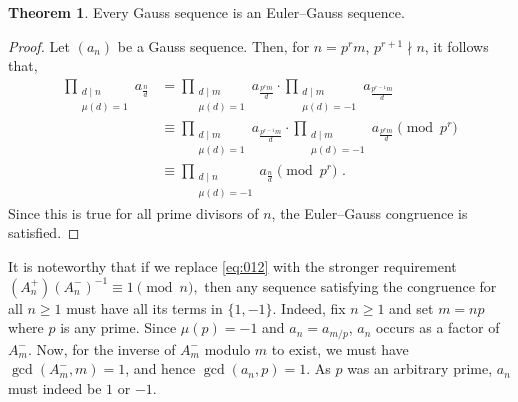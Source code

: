 \documentclass{article}
\numberwithin{equation}{section}
\theoremstyle{definition}
\newtheorem{theorem}[definition]{\bf {Theorem}}
\begin{document}
\begin{theorem}\label{thm:4}
    Every Gauss sequence is an Euler--Gauss sequence.
\end{theorem}
\begin{proof}
    Let $(a_n)$ be a Gauss sequence. Then, for $n=p^rm$, $p^{r+1}\nmid n$, it follows that, 
    \begin{align*}
        \prod_{\substack{d\mid n\\\mu(d)=1}}a_\frac{n}{d}
        &=\prod_{\substack{d\mid m\\\mu(d)=1}}a_\frac{p^rm}{d}\cdot\prod_{\substack{d\mid m\\\mu(d)=-1}}a_\frac{p^{r-1}m}{d}\\
        &\equiv \prod_{\substack{d\mid m\\\mu(d)=1}}a_\frac{p^{r-1}m}{d}\cdot\prod_{\substack{d\mid m\\\mu(d)=-1}}a_\frac{p^{r}m}{d} \pmod{p^r}\\
        &\equiv \prod_{\substack{d\mid n\\\mu(d)=-1}}a_\frac{n}{d} \pmod{p^r} \text{ .}
    \end{align*}
Since this is true for all prime divisors of $n$, the Euler--Gauss congruence is satisfied.
\end{proof}



It is noteworthy that if we replace \eqref{eq:012} with the stronger requirement $(A_n^+)(A_n^-)^{-1}\equiv1\pmod{n},$
then any sequence satisfying the congruence for all $n\geq1$ must have all its terms in $\{1,-1\}$. Indeed, fix $n\geq1$ and set $m=np$ where $p$ is any prime. Since $\mu(p)=-1$ and $a_n=a_{m/p}$, $a_n$ occurs as a factor of $A_m^-$. Now, for the inverse of $A_m^-$ modulo $m$ to exist, we must have $\gcd(A_m^-,m)=1$, and hence $\gcd(a_n,p)=1$. As $p$ was an arbitrary prime, $a_n$ must indeed be $1$ or $-1$. 
\end{document}
